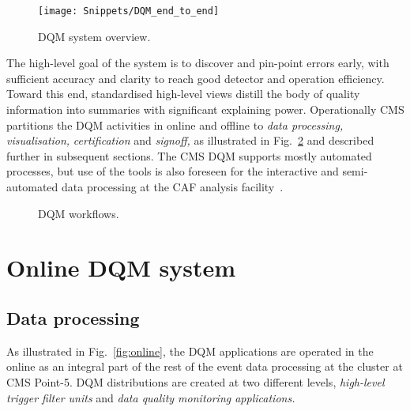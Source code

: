 \documentclass[a4paper]{jpconf}
\begin{document}
\begin{figure}[!b]
\begin{center}
\texttt{[image: Snippets/DQM\_end\_to\_end]}
\end{center}
\caption{\label{fig:overview}DQM system overview.}
\end{figure}

The high-level goal of the system is to discover and pin-point errors early,
with sufficient accuracy and clarity to reach good detector and operation
efficiency.  Toward this end, standardised high-level views distill the body
of quality information into summaries with significant explaining power.
Operationally CMS partitions the DQM activities in online and offline to {\em
  data processing,} {\em visualisation,} {\em certification} and {\em
  signoff,} as illustrated in Fig.~\ref{fig:systems} and described further in
subsequent sections.  The CMS DQM supports mostly automated processes, but use
of the tools is also foreseen for the interactive and semi-automated data
processing at the CAF analysis facility~\cite{cms_caf_09}.

\begin{figure}[!b]
\begin{center}
\hspace{1in}
\caption{\label{fig:systems}DQM workflows.}
\end{center}
\end{figure}


\section{Online DQM system}
\subsection{Data processing}

As illustrated in Fig.~\ref{fig:online}, the DQM applications are operated in
the online as an integral part of the rest of the event data processing at the
cluster at CMS Point-5.  DQM distributions are created at two different
levels, {\em high-level trigger filter units} and {\em data quality monitoring
  applications.}
\end{document}
